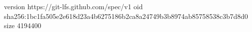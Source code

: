 version https://git-lfs.github.com/spec/v1
oid sha256:1bc1fa505e2e618d23a4b6275186b2ca8a24749b3b8974ab85758538c3b7d8d0
size 4194400
